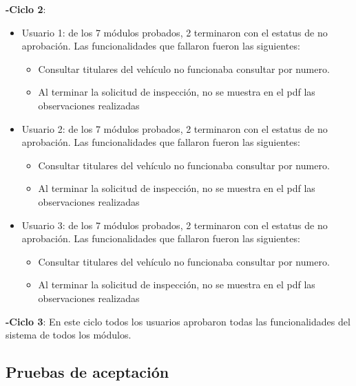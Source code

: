 \textbf{-Ciclo 2}: 
\begin{itemize}
	\item Usuario 1: de los 7 módulos probados, 2 terminaron con el estatus de no aprobación. Las funcionalidades que fallaron fueron las siguientes:
	 \begin{itemize}
		
			\item Consultar titulares del vehículo no funcionaba consultar por numero.
			\item Al terminar la solicitud de inspección, no se muestra en el pdf las observaciones realizadas
		  \end{itemize}

	\item Usuario 2: de los 7 módulos probados, 2 terminaron con el estatus de no aprobación. Las funcionalidades que fallaron fueron las siguientes:
	 \begin{itemize}
	 		
			\item Consultar titulares del vehículo no funcionaba consultar por numero.
			\item Al terminar la solicitud de inspección, no se muestra en el pdf las observaciones realizadas
		  \end{itemize}

	\item Usuario 3: de los 7 módulos probados, 2 terminaron con el estatus de no aprobación. Las funcionalidades que fallaron fueron las siguientes:
	 \begin{itemize}
			
			\item Consultar titulares del vehículo no funcionaba consultar por numero.
			\item Al terminar la solicitud de inspección, no se muestra en el pdf las observaciones realizadas
		  \end{itemize}

\end{itemize}

\textbf{-Ciclo 3}: En este ciclo todos los usuarios aprobaron todas las funcionalidades del sistema de todos los módulos.

\setlength{\parskip}{0mm}

\subsection{Pruebas de aceptación}
\setlength{\parskip}{5mm}

